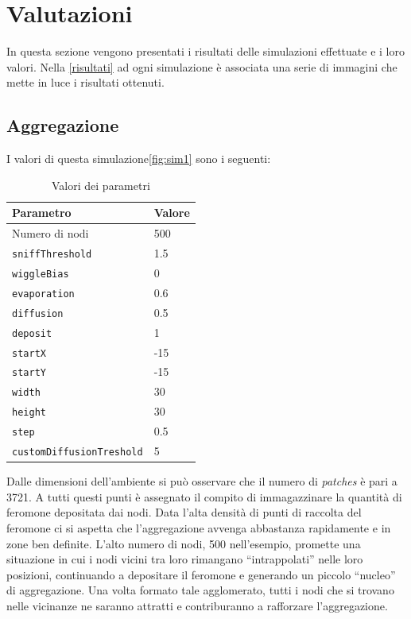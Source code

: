 \chapter{Valutazioni}
In questa sezione vengono presentati i risultati delle simulazioni effettuate e i loro valori.
Nella \cref{risultati} ad ogni simulazione è associata una serie di immagini che mette in luce i risultati ottenuti.
\section{Aggregazione}\label{sim1}
I valori di questa simulazione\space \cref{fig:sim1} sono i seguenti:
\begin{table}[ht]
    \centering
    \caption{Valori dei parametri}
    \begin{tabular}{ll}
        \toprule
        Parametro                   & Valore \\
        \midrule
        Numero di nodi              & 500    \\
        \texttt{sniffThreshold}     & 1.5    \\
        \texttt{wiggleBias}         & 0      \\
        \texttt{evaporation}        & 0.6    \\
        \texttt{diffusion}          & 0.5    \\
        \texttt{deposit}            & 1      \\
        \texttt{startX}             & -15    \\
        \texttt{startY}             & -15    \\
        \texttt{width}              & 30     \\
        \texttt{height}             & 30     \\
        \texttt{step}               & 0.5    \\
        \texttt{customDiffusionTreshold} & 5 \\
        \bottomrule
    \end{tabular}\label{tab:parametri1}
\end{table}\newline
Dalle dimensioni dell'ambiente si può osservare che il numero di \textit{patches} è pari a 3721. A tutti questi punti è assegnato il compito di 
immagazzinare la quantità di feromone depositata dai nodi. 
Data l'alta densità di punti di raccolta del feromone ci si aspetta che l'aggregazione avvenga abbastanza rapidamente e in zone ben definite. 
L'alto numero di nodi, 500 nell'esempio, promette una situazione in cui i nodi vicini tra loro rimangano ``intrappolati'' nelle loro posizioni, continuando a depositare il feromone e 
generando un piccolo ``nucleo'' di aggregazione. Una volta formato tale agglomerato, tutti i nodi che si trovano nelle vicinanze ne saranno attratti
e contriburanno a rafforzare l'aggregazione.



